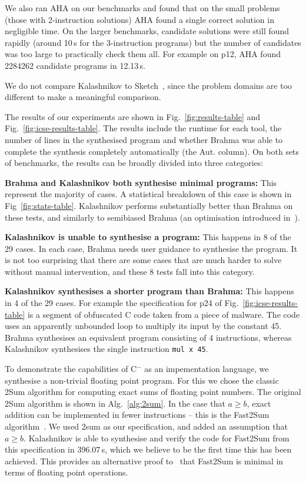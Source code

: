 \documentclass[a4paper]{llncs}
\newcommand{\newC}{C$^-$\xspace}
\begin{document}
We also ran {\sc AHA} on our benchmarks and found that on the small problems (those with 2-instruction solutions)
{\sc AHA} found a single correct solution in negligible time.  On the larger benchmarks, candidate solutions
were still found rapidly (around 10\,s for the 3-instruction programs) but the number of candidates was
too large to practically check them all.  For example on p12, {\sc AHA} found 2284262 candidate
programs in 12.13\,s.

We do not compare {\sc Kalashnikov} to {\sc Sketch}~\cite{sketch}, since the problem domains are
too different to make a meaningful comparison.

The results of our experiments are shown in Fig.~\ref{fig:results-table} and Fig.~\ref{fig:icse-results-table}.
The results include the runtime for each tool, the number of lines in the synthesised program and whether
{\sc Brahma} was able to complete the synthesis completely automatically (the Aut. column).
On both sets of benchmarks, the results can be broadly divided into three categories:

{\bf {\sc Brahma} and {\sc Kalashnikov} both synthesise minimal programs:}
This represent the majority of cases.  A statistical breakdown of this case is shown in Fig~\ref{fig:stats-table}.
{\sc Kalashnikov} performs substantially better than {\sc Brahma} on these tests, and similarly to
semibiased {\sc Brahma} (an optimisation introduced in~\cite{brahma-icse}).

{\bf {\sc Kalashnikov} is unable to synthesise a program:}
This happens in 8 of the 29 cases.  In each case, {\sc Brahma} needs user guidance to synthesise the program.
It is not too surprising that there are some cases that are much harder to solve without manual
intervention, and these 8 tests fall into this category.

{\bf {\sc Kalashnikov} synthesises a shorter program than {\sc Brahma}:}
This happens in 4 of the 29 cases.  For example the specification for p24 of Fig.~\ref{fig:icse-results-table} 
is a segment of obfuscated C code taken from a piece of malware.  The code uses an apparently unbounded loop
to multiply its input by the constant 45.  {\sc Brahma} synthesises an equivalent program consisting of
4 instructions, whereas {\sc Kalashnikov} synthesises the single instruction \texttt{mul x 45}.

To demonstrate the capabilities of \newC as an impementation language, we synthesise a
non-trivial floating point program.  For this we chose the classic {\sc 2Sum} algorithm for computing
exact sums of floating point numbers.  The original {\sc 2Sum} algorithm is shown in Alg.~\ref{alg:2sum}.
In the case that $a \ge b$, exact addition can be implemented in fewer instructions -- this is the
{\sc Fast2Sum} algorithm~\cite{fast2sum}.  We used {\sc 2sum} as our specification, and
added an assumption that $a \ge b$.  {\sc Kalashnikov} is able to synthesise and verify the
code for {\sc Fast2Sum} from this specification in 396.07\,s, which we believe to be the first time
this has been achieved.  This provides an alternative proof to~\cite{fast2sum} that {\sc Fast2Sum} is
minimal in terms of floating point operations.
\end{document}
